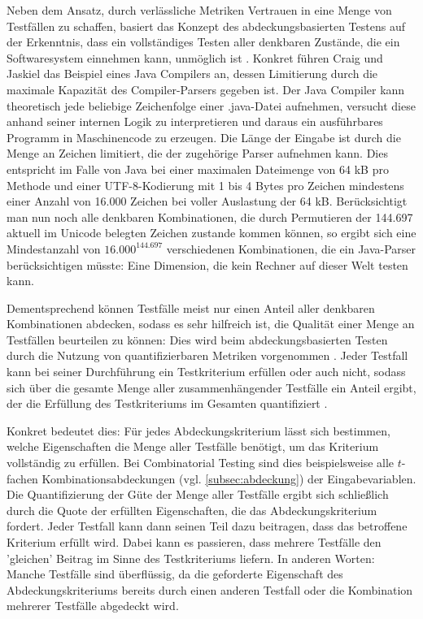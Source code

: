 Neben dem Ansatz, durch verlässliche Metriken Vertrauen in eine Menge von Testfällen zu schaffen, basiert das Konzept des abdeckungsbasierten Testens auf der Erkenntnis, dass ein vollständiges Testen aller denkbaren Zustände, die ein Softwaresystem einnehmen kann, unmöglich ist \cite[S. 16 f.]{craig2002systematic}. Konkret führen Craig und Jaskiel \cite[S. 16]{craig2002systematic} das Beispiel eines Java Compilers an, dessen Limitierung durch die maximale Kapazität des Compiler-Parsers gegeben ist. Der Java Compiler kann theoretisch jede beliebige Zeichenfolge einer .java-Datei aufnehmen, versucht diese anhand seiner internen Logik zu interpretieren und daraus ein ausführbares Programm in Maschinencode zu erzeugen. Die Länge der Eingabe ist durch die Menge an Zeichen limitiert, die der zugehörige Parser aufnehmen kann. Dies entspricht im Falle von Java bei einer maximalen Dateimenge von 64 kB pro Methode \cite{deva_2021} und einer UTF-8-Kodierung mit 1 bis 4 Bytes pro Zeichen mindestens einer Anzahl von 16.000 Zeichen bei voller Auslastung der 64 kB. Berücksichtigt man nun noch alle denkbaren Kombinationen, die durch Permutieren der 144.697 aktuell im Unicode belegten Zeichen \cite{unicode} zustande kommen können, so ergibt sich eine Mindestanzahl von $16.000^{144.697}$ verschiedenen Kombinationen, die ein Java-Parser berücksichtigen müsste: Eine Dimension, die kein Rechner auf dieser Welt testen kann.

Dementsprechend können Testfälle meist nur einen Anteil aller denkbaren Kombinationen abdecken, sodass es sehr hilfreich ist, die Qualität einer Menge an Testfällen beurteilen zu können: Dies wird beim abdeckungsbasierten Testen durch die Nutzung von quantifizierbaren Metriken vorgenommen \cite[S. 17]{craig2002systematic}. Jeder Testfall kann bei seiner Durchführung ein Testkriterium erfüllen oder auch nicht, sodass sich über die gesamte Menge aller zusammenhängender Testfälle ein Anteil ergibt, der die Erfüllung des Testkriteriums im Gesamten quantifiziert \cite[S. 17]{craig2002systematic}. 

Konkret bedeutet dies: Für jedes Abdeckungskriterium lässt sich bestimmen, welche Eigenschaften die Menge aller Testfälle benötigt, um das Kriterium vollständig zu erfüllen. Bei Combinatorial Testing sind dies beispielsweise alle $t$-fachen Kombinationsabdeckungen (vgl. \autoref{subsec:abdeckung}) der Eingabevariablen. Die Quantifizierung der Güte der Menge aller Testfälle ergibt sich schließlich durch die Quote der erfüllten Eigenschaften, die das Abdeckungskriterium fordert. Jeder Testfall kann dann seinen Teil dazu beitragen, dass das betroffene Kriterium erfüllt wird. Dabei kann es passieren, dass mehrere Testfälle den 'gleichen' Beitrag im Sinne des Testkriteriums liefern. In anderen Worten: Manche Testfälle sind überflüssig, da die geforderte Eigenschaft des Abdeckungskriteriums bereits durch einen anderen Testfall oder die Kombination mehrerer Testfälle abgedeckt wird. 

